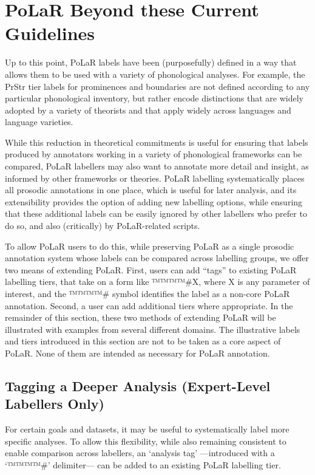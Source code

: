 \documentclass[11pt, twoside]{memoir}
\begin{document}
\chapter{PoLaR Beyond these Current Guidelines}\label{ch:beyond}
Up to this point, PoLaR labels have been (purposefully) defined in a way that allows them to be used with a variety of phonological analyses. For example, the PrStr tier labels for prominences and boundaries  are not defined according to any particular phonological inventory, but rather encode distinctions that are widely adopted by a variety of theorists and that apply widely across languages and language varieties.

While this reduction in theoretical commitments is useful for ensuring that labels produced by annotators working in a variety of phonological frameworks can be compared, PoLaR labellers may also want to annotate more detail and insight, as informed by other frameworks or theories. PoLaR labelling systematically places all prosodic annotations in one place, which is useful for later analysis, and its extensibility provides the option of adding new labelling options, while ensuring that these additional labels can be easily ignored by other labellers who prefer to do so, and also (critically) by PoLaR-related scripts.

To allow PoLaR users to do this, while preserving PoLaR as a single prosodic annotation system whose labels can be compared across labelling groups, we offer two means of extending PoLaR. First, users can add “tags” to existing PoLaR labelling tiers, that take on a form like ™™™™{\#X}, where X is any parameter of interest, and the ™™™™{\#} symbol identifies the label as a non-core PoLaR annotation. Second, a user can add additional tiers where appropriate. In the remainder of this section, these two methods of extending PoLaR will be illustrated with examples from several different domains. The illustrative labels and tiers introduced in this section are not to be taken as a core aspect of PoLaR. None of them are intended as necessary for PoLaR annotation.

\section{Tagging a Deeper Analysis (Expert-Level Labellers Only)}\label{sec:tagging-a-deeper-analysis-expert-level-labellers-only}

For certain goals and datasets, it may be useful to systematically label more specific analyses. To allow this flexibility, while also remaining consistent to enable comparison across labellers, an ‘analysis tag’ —introduced with a ‘™™™™{\#}’ delimiter— can be added to an existing PoLaR labelling tier.
\end{document}
